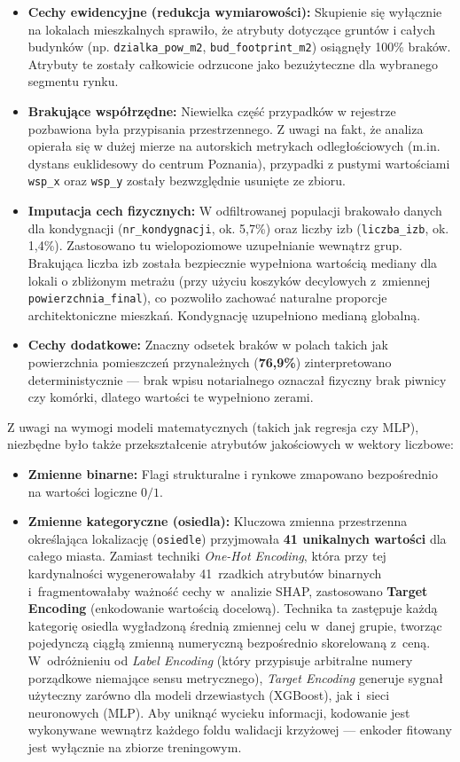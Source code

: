\documentclass[12pt,a4paper]{article}
\begin{document}
\begin{itemize}
    \item \textbf{Cechy ewidencyjne (redukcja wymiarowości):} Skupienie się wyłącznie na lokalach mieszkalnych sprawiło, że atrybuty dotyczące gruntów i całych budynków (np. \texttt{dzialka\_pow\_m2}, \texttt{bud\_footprint\_m2}) osiągnęły 100\% braków. Atrybuty te zostały całkowicie odrzucone jako bezużyteczne dla wybranego segmentu rynku.
    \item \textbf{Brakujące współrzędne:} Niewielka część przypadków w rejestrze pozbawiona była przypisania przestrzennego. Z uwagi na fakt, że analiza opierała się w dużej mierze na autorskich metrykach odległościowych (m.in. dystans euklidesowy do centrum Poznania), przypadki z pustymi wartościami \texttt{wsp\_x} oraz \texttt{wsp\_y} zostały bezwzględnie usunięte ze zbioru.
    \item \textbf{Imputacja cech fizycznych:} W odfiltrowanej populacji brakowało danych dla kondygnacji (\texttt{nr\_kondygnacji}, ok. 5,7\%) oraz liczby izb (\texttt{liczba\_izb}, ok. 1,4\%). Zastosowano tu wielopoziomowe uzupełnianie wewnątrz grup. Brakująca liczba izb została bezpiecznie wypełniona wartością mediany dla lokali o zbliżonym metrażu (przy użyciu koszyków decylowych z~zmiennej \texttt{powierzchnia\_final}), co pozwoliło zachować naturalne proporcje architektoniczne mieszkań. Kondygnację uzupełniono medianą globalną.
    \item \textbf{Cechy dodatkowe:} Znaczny odsetek braków w polach takich jak powierzchnia pomieszczeń przynależnych (\textbf{76,9\%}) zinterpretowano deterministycznie --- brak wpisu notarialnego oznaczał fizyczny brak piwnicy czy komórki, dlatego wartości te wypełniono zerami.
\end{itemize}

Z uwagi na wymogi modeli matematycznych (takich jak regresja czy MLP), niezbędne było także przekształcenie atrybutów jakościowych w wektory liczbowe:
\begin{itemize}
    \item \textbf{Zmienne binarne:} Flagi strukturalne i rynkowe zmapowano bezpośrednio na wartości logiczne $0/1$.
    \item \textbf{Zmienne kategoryczne (osiedla):} Kluczowa zmienna przestrzenna określająca lokalizację (\texttt{osiedle}) przyjmowała \textbf{41 unikalnych wartości} dla całego miasta.
    Zamiast techniki \textit{One-Hot Encoding}, która przy tej kardynalności wygenerowałaby 41~rzadkich atrybutów binarnych i~fragmentowałaby ważność cechy w~analizie SHAP, zastosowano \textbf{Target Encoding} (enkodowanie wartością docelową). Technika ta zastępuje każdą kategorię osiedla wygładzoną średnią zmiennej celu w~danej grupie, tworząc pojedynczą ciągłą zmienną numeryczną bezpośrednio skorelowaną z~ceną. W~odróżnieniu od \textit{Label Encoding} (który przypisuje arbitralne numery porządkowe niemające sensu metrycznego), \textit{Target Encoding} generuje sygnał użyteczny zarówno dla modeli drzewiastych (XGBoost), jak i~sieci neuronowych (MLP). Aby uniknąć wycieku informacji, kodowanie jest wykonywane wewnątrz każdego foldu walidacji krzyżowej --- enkoder fitowany jest wyłącznie na zbiorze treningowym.
\end{itemize}
\end{document}
